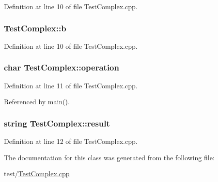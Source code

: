 Definition at line 10 of file Test\-Complex.\-cpp.

\hypertarget{classTestComplex_aa3676e7ac2b1b7fe6161a7f55bae9b6c}{
\subsubsection[{b}]{ Test\-Complex\-::b}}\label{classTestComplex_aa3676e7ac2b1b7fe6161a7f55bae9b6c}


Definition at line 10 of file Test\-Complex.\-cpp.

\hypertarget{classTestComplex_ad08c3789c2bcd4691d5d86b9dad0feda}{
\subsubsection[{operation}]{\setlength{\rightskip}{0pt plus 5cm}char Test\-Complex\-::operation}}\label{classTestComplex_ad08c3789c2bcd4691d5d86b9dad0feda}


Definition at line 11 of file Test\-Complex.\-cpp.



Referenced by main().

\hypertarget{classTestComplex_a020ea355cc113b32d000d7ff6fa6a136}{
\subsubsection[{result}]{\setlength{\rightskip}{0pt plus 5cm}string Test\-Complex\-::result}}\label{classTestComplex_a020ea355cc113b32d000d7ff6fa6a136}


Definition at line 12 of file Test\-Complex.\-cpp.



The documentation for this class was generated from the following file\-:\begin{DoxyCompactItemize}
\item 
test/\hyperlink{TestComplex_8cpp}{Test\-Complex.\-cpp}\end{DoxyCompactItemize}
